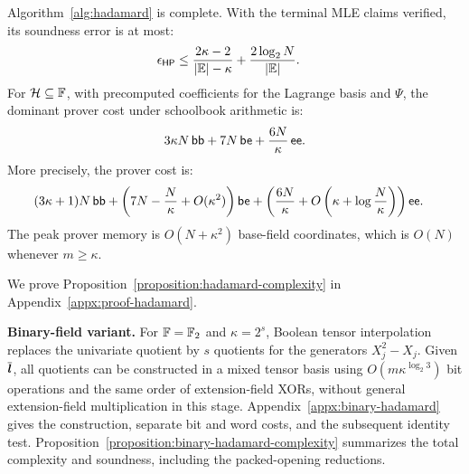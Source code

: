 \begin{proposition}
\label{proposition:hadamard-complexity}
Algorithm~\ref{alg:hadamard} is complete. With the terminal MLE
claims verified, its soundness error is at most:
\[
\begin{aligned}
    \epsilon_{\mathsf{HP}}
    &\leq
    \frac{2\kappa-2}
         {|\mathbb{E}|-\kappa}
    +
    \frac{2\log_2N}
         {|\mathbb{E}|}.
\end{aligned}
\]
For \(\mathcal H\subseteq{\mathbb{F}}\), with precomputed coefficients
for the Lagrange basis and \(\Psi\), the dominant prover cost
under schoolbook arithmetic is:
\[
    3\kappa N\,\mathsf{bb}
    +
    7N\,\mathsf{be}
    +
    \frac{6N}{\kappa}\,\mathsf{ee}.
\]
More precisely, the prover cost is:
\[
\begin{aligned}
    &(3\kappa+1)N\,\mathsf{bb}+
    \left(
        7N-\frac{N}{\kappa}
        +O(\kappa^2)
    \right)\mathsf{be}+
    \left(
        \frac{6N}{\kappa}
        +
        O\left(
            \kappa+\log\frac{N}{\kappa}
        \right)
    \right)\mathsf{ee}.
\end{aligned}
\]
The peak prover memory is \(O(N+\kappa^2)\) base-field
coordinates, which is \(O(N)\) whenever \(m\geq\kappa\).
\end{proposition}

We prove Proposition~\ref{proposition:hadamard-complexity} in
Appendix~\ref{appx:proof-hadamard}.

\smallskip\noindent\textbf{Binary-field variant.}
For \({\mathbb{F}}=\mathbb F_2\) and \(\kappa=2^s\), Boolean
tensor interpolation replaces the univariate quotient by \(s\)
quotients for the generators \(X_j^2-X_j\).
Given \(\overline{\bm l}\), all quotients can be constructed in a
mixed tensor basis using \(O(m\kappa^{\log_2 3})\) bit operations
and the same order of extension-field XORs, without general
extension-field multiplication in this stage.
Appendix~\ref{appx:binary-hadamard} gives the construction,
separate bit and word costs, and the subsequent identity test.
Proposition~\ref{proposition:binary-hadamard-complexity}
summarizes the total complexity and soundness, including the
packed-opening reductions.

